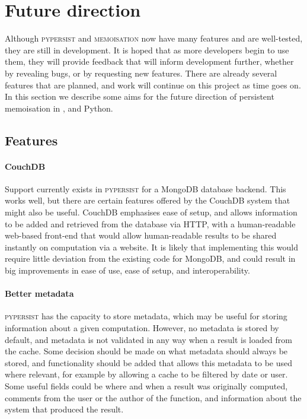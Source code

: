 \documentclass{deliverablereport}
\newcommand{\pypersist}{\textsc{pypersist}}
\newcommand{\Memoisation}{\textsc{memoisation}}
\begin{document}
\section{Future direction}
\label{sec:future}

Although \pypersist{} and \Memoisation{} now have many features and are
well-tested, they are still in
development.  It is hoped that as more developers begin to use them, they will
provide feedback that will inform development further, whether by revealing
bugs, or by requesting new features.  There are already several features that
are planned, and work will continue on this project as time goes on.  In this
section we describe some aims for the future direction of persistent memoisation
in \GAP, \Sage and Python.

\subsection{Features}

\paragraph{CouchDB}
Support currently exists in \pypersist{} for a MongoDB database backend.  This
works well, but there are certain features offered by the CouchDB system that
might also be useful.  CouchDB emphasises ease of setup, and allows information
to be added and retrieved from the database via HTTP, with a human-readable
web-based front-end that would allow human-readable results to be shared
instantly on computation via a website.  It is likely that implementing this
would require little deviation from the existing code for MongoDB, and could
result in big improvements in ease of use, ease of setup, and interoperability.

\paragraph{Better metadata}
\pypersist{} has the capacity to store metadata, which may be useful for storing
information about a given computation.  However, no
metadata is stored by default, and metadata is not validated in any way when a
result is loaded from the cache.  Some decision should be made on what metadata
should always be stored, and functionality should be added that allows this
metadata to be used where relevant, for example by allowing a cache to be
filtered by date or user.
Some useful fields could be where and when a result was originally computed,
comments from the user or the author of the function, and information about the
system that produced the result.
\end{document}
